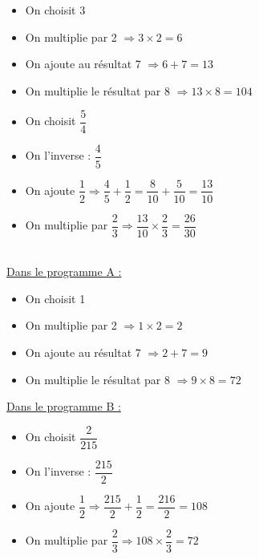 \documentclass[../Cours.tex]{subfiles}
\begin{document}
\clearpage
\thispagestyle{empty}
\color{black}

\titreDScorrection

\begin{questions}
        \question
        \begin{itemize}
            \item On choisit 3
            \item On multiplie par 2 $\Rightarrow 3 \times 2 = 6$
            \item On ajoute au résultat 7 $\Rightarrow 6 + 7 = 13 $
            \item On multiplie le résultat par 8 $\Rightarrow 13 \times 8 = 104$
        \end{itemize}
        \question
        \begin{itemize}
            \item On choisit $\dfrac{5}{4}$
            \item On l'inverse : $\dfrac{4}{5}$
            \item On ajoute $\dfrac{1}{2} \Rightarrow \dfrac{4}{5} + \dfrac{1}{2} = \dfrac{8}{10} + \dfrac{5}{10} = \dfrac{13}{10}$
            \item On multiplie par $\dfrac{2}{3} \Rightarrow \dfrac{13}{10} \times \dfrac{2}{3} = \dfrac{26}{30}$
        \end{itemize}
        \question\\
        \underline{Dans le programme A :} 
        \begin{itemize}
            \item On choisit 1
            \item On multiplie par 2 $\Rightarrow 1 \times 2 = 2$
            \item On ajoute au résultat 7 $\Rightarrow 2 + 7 = 9 $
            \item On multiplie le résultat par 8 $\Rightarrow 9 \times 8 = 72$
        \end{itemize}
        \underline{Dans le programme B :}
        \begin{itemize}
            \item On choisit $\dfrac{2}{215}$
            \item On l'inverse : $\dfrac{215}{2}$
            \item On ajoute $\dfrac{1}{2} \Rightarrow \dfrac{215}{2} + \dfrac{1}{2} = \dfrac{216}{2} = 108$
            \item On multiplie par $\dfrac{2}{3} \Rightarrow 108 \times \dfrac{2}{3} = 72$
        \end{itemize}


\end{questions}
\end{document}
